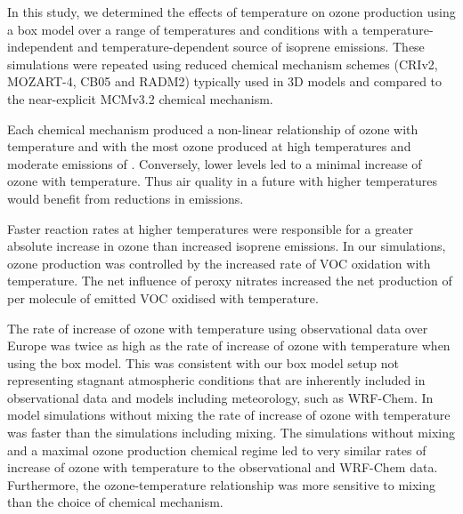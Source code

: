 In this study, we determined the effects of temperature on ozone production using a box model over a range of temperatures and  conditions with a temperature-independent and temperature-dependent source of isoprene emissions.
These simulations were repeated using reduced chemical mechanism schemes (CRIv2, MOZART-4, CB05 and RADM2) typically used in 3D models and compared to the near-explicit MCMv3.2 chemical mechanism.

Each chemical mechanism produced a non-linear relationship of ozone with temperature and  with the most ozone produced at high temperatures and moderate emissions of .
Conversely, lower  levels led to a minimal increase of ozone with temperature.
Thus air quality in a future with higher temperatures would benefit from reductions in  emissions.

Faster reaction rates at higher temperatures were responsible for a greater absolute increase in ozone than increased isoprene emissions.
In our simulations, ozone production was controlled by the increased rate of VOC oxidation with temperature.
The net influence of peroxy nitrates increased the net production of  per molecule of emitted VOC oxidised with temperature.

The rate of increase of ozone with temperature using observational data over Europe was twice as high as the rate of increase of ozone with temperature when using the box model.
This was consistent with our box model setup not representing stagnant atmospheric conditions that are inherently included in observational data and models including meteorology, such as WRF-Chem.
In model simulations without mixing the rate of increase of ozone with temperature was faster than the simulations including mixing.
The simulations without mixing and a maximal ozone production chemical regime led to very similar rates of increase of ozone with temperature to the observational and WRF-Chem data.
Furthermore, the ozone-temperature relationship was more sensitive to mixing than the choice of chemical mechanism.
